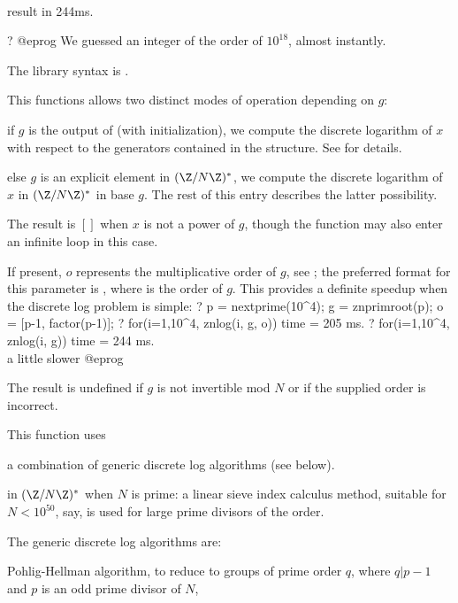 \\ result in 244ms.

? %
@eprog\noindent
We guessed an integer of the order of $10^{18}$, almost instantly.

The library syntax is .

\label{se:znlog}
This functions allows two distinct modes of operation depending
on $g$:

\item if $g$ is the output of  (with initialization),
we compute the discrete logarithm of $x$ with respect to the generators
contained in the structure. See  for details.

\item else $g$ is an explicit element in $(\Z/N\Z)^*$, we compute the
discrete logarithm of $x$ in $(\Z/N\Z)^*$ in base $g$. The rest of this
entry describes the latter possibility.

The result is $[]$ when $x$ is not a power of $g$, though the function may
also enter an infinite loop in this case.

If present, $o$ represents the multiplicative order of $g$, see
; the preferred format for this parameter is
, where  is the order of $g$.
This provides a definite speedup when the discrete log problem is simple:
\bprog
? p = nextprime(10^4); g = znprimroot(p); o = [p-1, factor(p-1)];
? for(i=1,10^4, znlog(i, g, o))
time = 205 ms.
? for(i=1,10^4, znlog(i, g))
time = 244 ms. \\ a little slower
@eprog

The result is undefined if $g$ is not invertible mod $N$ or if the supplied
order is incorrect.

This function uses

\item a combination of generic discrete log algorithms (see below).

\item in $(\Z/N\Z)^*$ when $N$ is prime: a linear sieve index calculus
method, suitable for $N < 10^{50}$, say, is used for large prime divisors of
the order.

The generic discrete log algorithms are:

\item Pohlig-Hellman algorithm, to reduce to groups of prime order $q$,
where $q | p-1$ and $p$ is an odd prime divisor of $N$,

